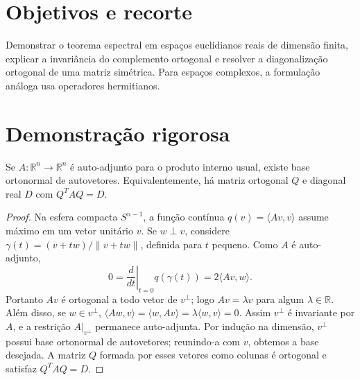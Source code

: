 \documentclass[11pt,a4paper]{article}
\begin{document}
\section{Objetivos e recorte}
Demonstrar o teorema espectral em espaços euclidianos reais de dimensão finita, explicar a invariância do complemento ortogonal e resolver a diagonalização ortogonal de uma matriz simétrica. Para espaços complexos, a formulação análoga usa operadores hermitianos.
\section{Demonstração rigorosa}
\begin{teorema}
Se $A:\mathbb R^n\to\mathbb R^n$ é auto-adjunto para o produto interno usual, existe base ortonormal de autovetores. Equivalentemente, há matriz ortogonal $Q$ e diagonal real $D$ com $Q^TAQ=D$.
\end{teorema}
\begin{proof}
Na esfera compacta $S^{n-1}$, a função contínua $q(v)=\langle Av,v\rangle$ assume máximo em um vetor unitário $v$. Se $w\perp v$, considere
$\gamma(t)=(v+tw)/\|v+tw\|$, definida para $t$ pequeno. Como $A$ é auto-adjunto,
\[
0=\left.\frac{d}{dt}\right|_{t=0}q(\gamma(t))
=2\langle Av,w\rangle.
\]
Portanto $Av$ é ortogonal a todo vetor de $v^\perp$; logo $Av=\lambda v$ para algum $\lambda\in\mathbb R$. Além disso, se $w\in v^\perp$,
$\langle Aw,v\rangle=\langle w,Av\rangle=\lambda\langle w,v\rangle=0$.
Assim $v^\perp$ é invariante por $A$, e a restrição $A|_{v^\perp}$ permanece auto-adjunta. Por indução na dimensão, $v^\perp$ possui base ortonormal de autovetores; reunindo-a com $v$, obtemos a base desejada. A matriz $Q$ formada por esses vetores como colunas é ortogonal e satisfaz $Q^TAQ=D$.
\end{proof}
\end{document}
